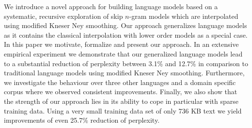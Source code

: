 We introduce a novel approach for building language models based on a systematic, recursive exploration of skip $n$-gram models which are interpolated using modified Kneser Ney smoothing. Our approach generalizes language models as it contains the classical interpolation with lower order models as a special case. In this paper we motivate, formalize and present our approach. In an extensive empirical experiment we demonstrate that our generalized language models lead to a substantial reduction of perplexity between 3.1\% and 12.7\% in comparison to traditional language models using modified Kneser Ney smoothing. Furthermore, we investigate the behaviour over three other languages and a domain specific corpus where we observed consistent improvements. Finally, we also show that the strength of our approach lies in its ability to cope in particular with sparse training data. Using a very small training data set of only 736 KB text we yield improvements of even 25.7\% reduction of perplexity.
